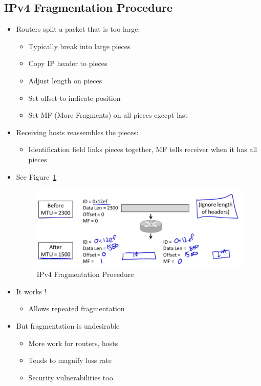 \documentclass[12pt]{ctexart}   %
\begin{document}
	\subsection{IPv4 Fragmentation Procedure}
	\begin{itemize}
		\item Routers split a packet that is too large:
		\begin{itemize}
			\item Typically break into large pieces
			\item Copy IP header to pieces
			\item Adjust length on pieces
			\item Set offset to indicate position
			\item Set MF (More Fragments) on all pieces except last
		\end{itemize}
		
		\item Receiving hosts reassembles the pieces:
		\begin{itemize}
			\item Identification field links pieces together, MF tells receiver when it has all pieces
		\end{itemize}
		\item See Figure~\ref{fig:4-7-3}
		
		\begin{figure}[h!] %
		\centering
		 \includegraphics[scale=0.7]{images/4-7-3}
		\caption{ IPv4 Fragmentation Procedure }
		 \label{fig:4-7-3}
		 \end{figure}
		 
		 \item It works !
		 \begin{itemize}
		 	\item Allows repeated fragmentation
		 \end{itemize}
		 
		 \item But fragmentation is undesirable
		 \begin{itemize}
		 	\item More work for routers, hosts
		 	\item Tends to magnify loss rate
		 	\item Security vulnerabilities too
		 \end{itemize}
	\end{itemize}
	
\end{document}
